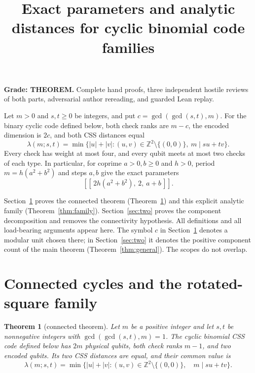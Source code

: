 \documentclass{article}
\title{Exact parameters and analytic distances for cyclic binomial code families}
\author{}
\date{}
\newtheorem{theorem}{Theorem}
\numberwithin{equation}{section}
\begin{document}
\maketitle

\renewcommand{\theequation}{\arabic{equation}}

\textbf{Grade: THEOREM.} Complete hand proofs, three independent hostile reviews of
both parts, adversarial author rereading, and guarded Lean replay.

Let \(m>0\) and \(s,t\ge0\) be integers, and put \(c=\gcd(\gcd(s,t),m)\).
For the binary cyclic code defined below, both check ranks are \(m-c\), the
encoded dimension is \(2c\), and both CSS distances equal
\begin{equation}\label{eq:summary-lambda}
  \lambda(m;s,t)=\min\{|u|+|v|:(u,v)\in\mathbb Z^2\setminus\{(0,0)\},\ m\mid su+tv\}.
\end{equation}
Every check has weight at most four, and every qubit meets at most two
checks of each type. In particular, for coprime \(a>0,b\ge0\) and \(h>0\),
period \(m=h(a^2+b^2)\) and steps \(a,b\) give the exact parameters
\begin{equation}\label{eq:summary-family}
  [[\,2h(a^2+b^2),\ 2,\ a+b\,]].
\end{equation}

Section~\ref{sec:one} proves the connected theorem (Theorem~\ref{thm:connected}) and this
explicit analytic family (Theorem~\ref{thm:family}).
Section~\ref{sec:two} proves the component decomposition and removes the connectivity
hypothesis. All definitions and all load-bearing arguments appear here.
The symbol \(c\) in Section~\ref{sec:one} denotes
a modular unit chosen there; in Section~\ref{sec:two} it denotes the positive component
count of the main theorem (Theorem~\ref{thm:general}). The scopes do not overlap.

\section{Connected cycles and the rotated-square family}\label{sec:one}
\renewcommand{\theequation}{\thesection.\arabic{equation}}

\begin{theorem}[connected theorem]\label{thm:connected}
  Let \(m\) be a positive integer and let \(s,t\) be nonnegative integers with
  \(\gcd(\gcd(s,t),m)=1\). The cyclic binomial CSS code defined below has \(2m\)
  physical qubits, both check ranks \(m-1\), and two encoded qubits. Its two CSS
  distances are equal, and their common value is
  \begin{equation}\label{eq:connected-lambda}
    \lambda(m;s,t)=\min\{\lvert u\rvert+\lvert v\rvert:
     (u,v)\in\mathbb Z^2\setminus\{(0,0)\},\quad m\mid su+tv\}.
  \end{equation}
\end{theorem}
\end{document}
